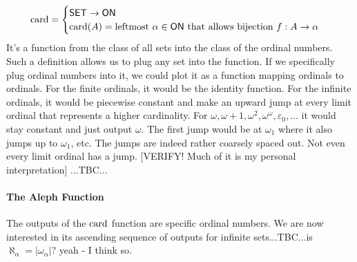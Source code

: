 \begin{equation}
\operatorname{card} = 
\begin{cases}
\mathsf{SET} \rightarrow \mathsf{ON} \\
\operatorname{card}(A) = \text{leftmost } \alpha \in \mathsf{ON} \text{ that allows bijection } 
           f: A \rightarrow \alpha
\end{cases}
\end{equation}
It's a function from the class of all sets into the class of the ordinal numbers. Such a definition allows us to plug any set into the function. If we specifically plug ordinal numbers into it, we could plot it as a function mapping ordinals to ordinals. For the finite ordinals, it would be the identity function. For the infinite ordinals, it would be piecewise constant and make an upward jump at every limit ordinal that represents a higher cardinality. For $\omega, \omega+1, \omega^2, \omega^\omega, \varepsilon_0, \ldots$ it would stay constant and just output $\omega$. The first jump would be at $\omega_1$ where it also jumps up to $\omega_1$, etc. The jumps are indeed rather coarsely spaced out. Not even every limit ordinal has a jump. [VERIFY! Much of it is my personal interpretation] ...TBC...



\paragraph{The Aleph Function} 
The outputs of the $\operatorname{card}$ function are specific ordinal numbers. We are now interested in its ascending sequence of outputs for infinite sets...TBC...is $\aleph_{\alpha} = |\omega_{\alpha}|$? yeah - I think so.




